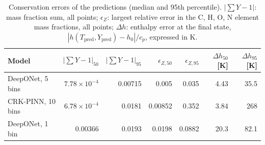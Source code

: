 \begin{table}[htbp]
    \centering
    \small
    \begin{tabular}{lrrrrrr}
        \hline
        Model & $|\sum Y-1|_{50}$ & $|\sum Y-1|_{95}$ & $\epsilon_{Z,50}$ & $\epsilon_{Z,95}$ & $\Delta h_{50}$ [K] & $\Delta h_{95}$ [K] \\
        \hline
        DeepONet, 5 bins & $7.78\times10^{-4}$ & 0.00715 & 0.005 & 0.035 & 4.43 & 35.5 \\
        CRK-PINN, 10 bins & $6.78\times10^{-4}$ & 0.0181 & 0.00852 & 0.352 & 3.84 & 268 \\
        DeepONet, 1 bin & 0.00366 & 0.0193 & 0.0198 & 0.0882 & 20.3 & 82.1 \\
        \hline
    \end{tabular}
    \caption{Conservation errors of the predictions (median and 95th percentile). $|\sum Y-1|$: mass fraction sum, all points; $\epsilon_Z$: largest relative error in the C, H, O, N element mass fractions, all points; $\Delta h$: enthalpy error at the final state, $|h(T_\mathrm{pred},Y_\mathrm{pred})-h_0|/c_p$, expressed in K.}
    \label{tab:conservation}
\end{table}
